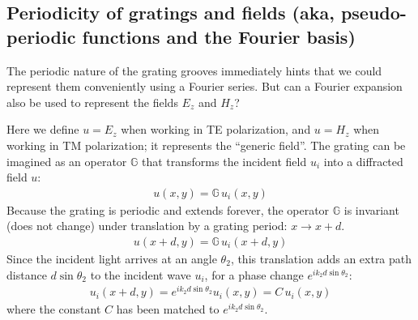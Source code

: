 \subsection{Periodicity of gratings and fields (aka, pseudo-periodic functions and the Fourier basis)}
The periodic nature of the grating grooves immediately hints that we could represent them conveniently using a Fourier series.  But can a Fourier expansion also be used to represent the fields $E_z$ and $H_z$?

Here we define $u = E_z$ when working in TE polarization, and $u = H_z$ when working in TM polarization; it represents the ``generic field''.  The grating can be imagined as an operator $\mathbb{G}$ that transforms the incident field $u_i$ into a diffracted field $u$:
\begin{align}
u(x,y) = \mathbb{G} \, u_i(x,y)
\end{align}
Because the grating is periodic and extends forever, the operator $\mathbb{G}$ is invariant (does not change) under translation by a grating period: $x \rightarrow x+d$.  
\begin{align}
u(x+d,y) = \mathbb{G} \, u_i(x+d,y)
\end{align}
Since the incident light arrives at an angle $\theta_2$, this translation adds an extra path distance $d \sin \theta_2$ to the incident wave $u_i$, for a phase change $e^{i k_2 d \sin \theta_2}$:
\begin{align}
u_i(x+d, y) = e^{i k_2 d \sin \theta_2} u_i(x, y) = C \, u_i(x,y)
\end{align}
where the constant $C$ has been matched to $e^{i k_2 d \sin \theta_2}$.

